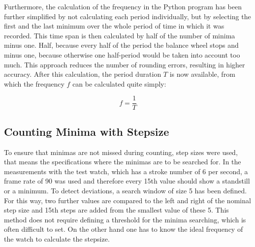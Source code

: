 \documentclass[12pt, a4paper]{report}
\begin{document}
    Furthermore, the calculation of the frequency in the Python program has been further simplified by not calculating each period individually, but by selecting the first and the last minimum over the whole period of time in which it was recorded. This time span is then calculated by half of the number of minima minus one. Half, because every half of the period the balance wheel stops and minus one, because otherwise one half-period would be taken into account too much. This approach reduces the number of rounding errors, resulting in higher accuracy. After this calculation, the period duration $T$ is now available, from which the frequency $f$ can be calculated quite simply: 
    
     \begin{displaymath}
      f = \frac{1}{T}
     \end{displaymath}
     
  \subsection{Counting Minima with Stepsize}
  To ensure that minimas are not missed during counting, step sizes were used, that means the specifications where the minimas are to be searched for. In the measurements with the test watch, which has a stroke number of 6 per second, a frame rate of 90 was used and therefore every 15th value should show a standstill or a minimum. To detect deviations, a search window of size 5 has been defined.
  For this way, two further values are compared to the left and right of the nominal step size and 15th steps are added from the smallest value of these 5. This method does not require defining a threshold for the minima searching, which is often difficult to set. On the other hand one has to know the ideal frequency of the watch to calculate the stepsize.
  
\end{document}

